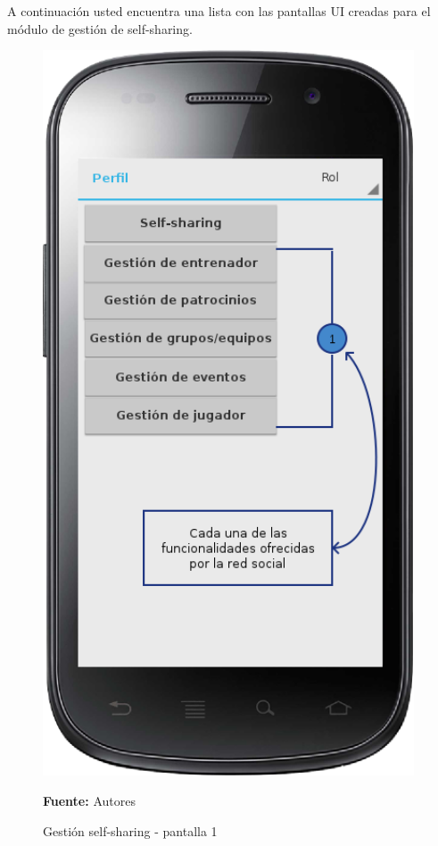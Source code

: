 A continuación usted encuentra una lista con las pantallas UI creadas para el módulo de gestión de self-sharing.

\begin{figure}[!htb]
  \begin{center}
    \includegraphics[width=11cm]{./imagenes/UI/Self_sharing/self_sharing_1.png}
    \caption{Gestión self-sharing - pantalla 1}
    \label{fig:self_sharing_1}
    \textbf{Fuente:}  Autores
  \end{center}
\end{figure}


